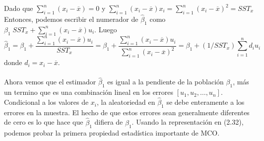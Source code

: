 Dado que $\sum\limits_{i=1}^n (x_i-\overline{x}) = 0$ y $\sum\limits_{i=1}^n (x_i-\overline{x})x_i = \sum\limits_{i=1}^n (x_i-\overline{x})^2 = SST_x$ 
Entonces, podemos escribir el numerador de $\hat{\beta}_1$ como $\beta_1 \; SST_x + \sum\limits_{i=1}^n(x_i-\overline{x})u_i$. Luego
\begin{equation}
    \hat{\beta}_1 = \beta_1 + \dfrac{\sum\limits_{i=1}^n (x_i-\overline{x})u_i}{SST_x} = \beta_1 + \dfrac{\sum\limits_{i=1}^n (x_i-\overline{x})u_i}{\sum\limits_{i=1}^n (x_i - \overline{x})^2} = \beta_1 + (1/SST_x) \sum\limits_{i=1}^n d_i u_i
\end{equation}
donde $d_i = x_i - \overline{x}$.\\\\

Ahora vemos que el estimador $\hat{\beta}_1$ es igual a la pendiente de la población $\beta_1$, más un termino que es una combinación lineal en los errores $[u_1,u_2,\ldots,u_n]$. Condicional a los valores de $x_i$, la aleatoriedad en $\hat{\beta}_1$ se debe enteramente a los errores en la muestra. El hecho de que estos errores sean generalmente diferentes de cero es lo que hace que $\hat{\beta}_1$ difiera de $\beta_1$. Usando la representación en (2.32), podemos probar la primera propiedad estadística importante de MCO.\\

